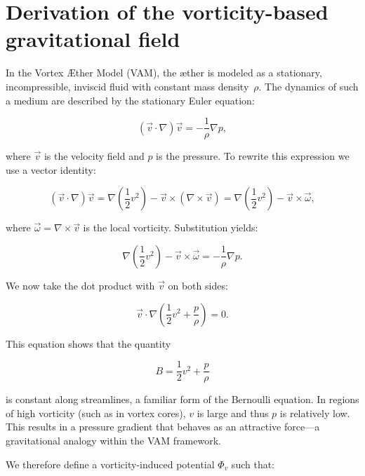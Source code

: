\section{Derivation of the vorticity-based gravitational field}\label{sec:appendix:2}

In the Vortex Æther Model (VAM), the æther is modeled as a stationary, incompressible, inviscid fluid with constant mass density~$\rho$. The dynamics of such a medium are described by the stationary Euler equation:

\begin{equation}
(\vec{v} \cdot \nabla)\vec{v} = -\frac{1}{\rho} \nabla p,
\end{equation}

where $\vec{v}$ is the velocity field and $p$ is the pressure. To rewrite this expression we use a vector identity:

\begin{equation}
(\vec{v} \cdot \nabla)\vec{v} = \nabla\left(\frac{1}{2}v^2\right) - \vec{v} \times (\nabla \times \vec{v}) = \nabla\left(\frac{1}{2}v^2\right) - \vec{v} \times \vec{\omega},
\end{equation}

where $\vec{\omega} = \nabla \times \vec{v}$ is the local vorticity. Substitution yields:

\begin{equation}
    \nabla\left(\frac{1}{2}v^2\right) - \vec{v} \times \vec{\omega} = -\frac{1}{\rho} \nabla p.
\end{equation}

We now take the dot product with $\vec{v}$ on both sides:

\begin{equation}
    \vec{v} \cdot \nabla\left(\frac{1}{2}v^2 + \frac{p}{\rho}\right) = 0.
\end{equation}

This equation shows that the quantity

\begin{equation}
    B = \frac{1}{2}v^2 + \frac{p}{\rho}
\end{equation}

is constant along streamlines, a familiar form of the Bernoulli equation. In regions of high vorticity (such as in vortex cores), $v$ is large and thus $p$ is relatively low. This results in a pressure gradient that behaves as an attractive force—a gravitational analogy within the VAM framework.

We therefore define a vorticity-induced potential $\Phi_v$ such that:

